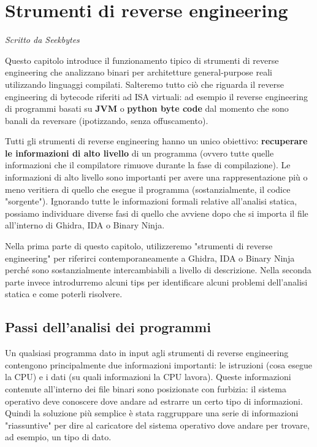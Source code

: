 \documentclass[oneside,a4paper,11pt]{book}
\theoremstyle{italicstyle}
\theoremstyle{normStyle}
\begin{document}
\chapter{Strumenti di reverse engineering}

\textit{Scritto da Seekbytes}

Questo capitolo introduce il funzionamento tipico di strumenti di reverse engineering che analizzano binari per architetture general-purpose reali utilizzando linguaggi compilati. Salteremo tutto ciò che riguarda il reverse engineering di bytecode riferiti ad ISA virtuali: ad esempio il reverse engineering di programmi basati su \textbf{JVM} o \textbf{python byte code} dal momento che sono banali da reversare (ipotizzando, senza offuscamento).

Tutti gli strumenti di reverse engineering hanno un unico obiettivo: \textbf{recuperare le informazioni di alto livello} di un programma (ovvero tutte quelle informazioni che il compilatore rimuove durante la fase di compilazione). Le informazioni di alto livello sono importanti per avere una rappresentazione più o meno veritiera di quello che esegue il programma (sostanzialmente, il codice "sorgente"). Ignorando tutte le informazioni formali relative all'analisi statica, possiamo individuare diverse fasi di quello che avviene dopo che si importa il file all'interno di Ghidra, IDA o Binary Ninja.  

Nella prima parte di questo capitolo, utilizzeremo "strumenti di reverse engineering" per riferirci contemporaneamente a Ghidra, IDA o Binary Ninja perché sono sostanzialmente intercambiabili a livello di descrizione. Nella seconda parte invece introdurremo alcuni tips per identificare alcuni problemi dell'analisi statica e come poterli risolvere.

\section{Passi dell'analisi dei programmi}

Un qualsiasi programma dato in input agli strumenti di reverse engineering contengono principalmente due informazioni importanti: le istruzioni (cosa esegue la CPU) e i dati (su quali informazioni la CPU lavora). Queste informazioni contenute all'interno dei file binari sono posizionate con furbizia: il sistema operativo deve conoscere dove andare ad estrarre un certo tipo di informazioni. Quindi la soluzione più semplice è stata raggruppare una serie di informazioni "riassuntive" per dire al caricatore del sistema operativo dove andare per trovare, ad esempio, un tipo di dato.
\end{document}
